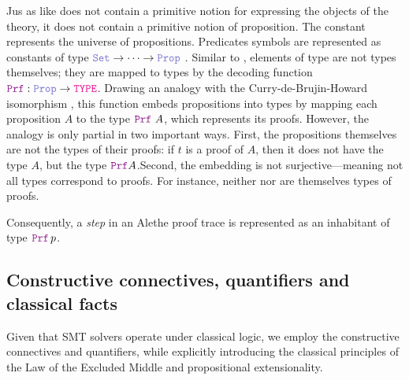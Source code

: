 Jus as like \lpm{} does not contain a primitive notion for expressing the objects of the theory, it does not contain a primitive notion of proposition.
The constant \prop{} represents the universe of propositions. Predicates symbols are represented as constants of type $\set{} \ra \dots \ra \prop$ .
Similar to \set{}, elements of type \prop{} are not types themselves; they are mapped to types by the decoding function $\prf{}: \prop \rightarrow \type$.
Drawing an analogy with the Curry-de-Brujin-Howard isomorphism \cite{curryhoward}, this function embeds propositions into types by mapping each proposition $A$ to the type $\prf{}~A$, which represents its proofs.
However, the analogy is only partial in two important ways. First, the propositions themselves are not the types of their proofs: if $t$ is a proof of $A$, then it does not have the type $A$,
but the type $\prf{}A$.Second, the embedding is not surjective—meaning not all types correspond to proofs. For instance, neither \set{} nor \prop{} are themselves types of proofs. 

Consequently, a \emph{step} in an Alethe proof trace is represented as an inhabitant of type $\prf{}\,p$.

\subsection{Constructive connectives, quantifiers and classical facts}
\label{ssec:encoding-prop}

Given that SMT solvers operate under classical logic, we employ the constructive connectives and quantifiers,
while explicitly introducing the classical principles of the Law of the Excluded Middle and propositional extensionality.

